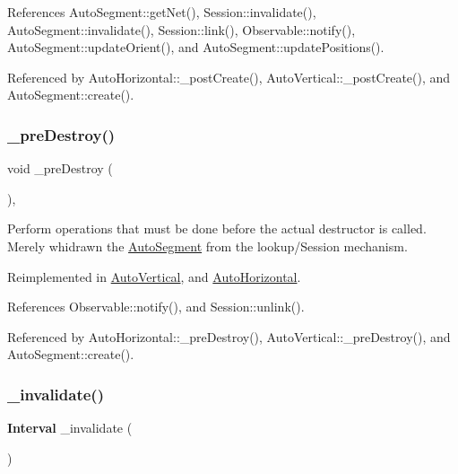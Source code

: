 References Auto\+Segment\+::get\+Net(), Session\+::invalidate(), Auto\+Segment\+::invalidate(), Session\+::link(), Observable\+::notify(), Auto\+Segment\+::update\+Orient(), and Auto\+Segment\+::update\+Positions().



Referenced by Auto\+Horizontal\+::\+\_\+post\+Create(), Auto\+Vertical\+::\+\_\+post\+Create(), and Auto\+Segment\+::create().

\mbox{\label{classKatabatic_1_1AutoSegment_a7c13d9795eafd477994961f8a0d962d0}} 
\subsubsection{\texorpdfstring{\+\_\+pre\+Destroy()}{\_preDestroy()}}
{\footnotesize\ttfamily void \+\_\+pre\+Destroy (\begin{DoxyParamCaption}{ }\end{DoxyParamCaption})\hspace{0.3cm}{\ttfamily [protected]}, {\ttfamily [virtual]}}

Perform operations that must be done before the actual destructor is called. Merely whidrawn the \hyperlink{classKatabatic_1_1AutoSegment}{Auto\+Segment} from the lookup/\+Session mechanism. 

Reimplemented in \hyperlink{classKatabatic_1_1AutoVertical_a7c13d9795eafd477994961f8a0d962d0}{Auto\+Vertical}, and \hyperlink{classKatabatic_1_1AutoHorizontal_a7c13d9795eafd477994961f8a0d962d0}{Auto\+Horizontal}.



References Observable\+::notify(), and Session\+::unlink().



Referenced by Auto\+Horizontal\+::\+\_\+pre\+Destroy(), Auto\+Vertical\+::\+\_\+pre\+Destroy(), and Auto\+Segment\+::create().

\mbox{\label{classKatabatic_1_1AutoSegment_a6a98d2e5839b880893703ad45db4e4c4}} 
\subsubsection{\texorpdfstring{\+\_\+invalidate()}{\_invalidate()}}
{\footnotesize\ttfamily \textbf{ Interval} \+\_\+invalidate (\begin{DoxyParamCaption}{ }\end{DoxyParamCaption})\hspace{0.3cm}{\ttfamily [protected]}}

